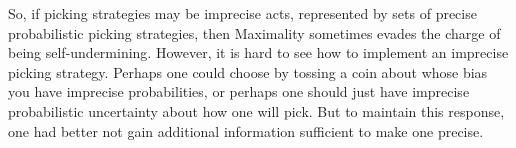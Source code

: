 \documentclass[a4paper]{article}
\newcommand\N{\mathbf{N}}
\renewcommand\P{\mathbb{P}} %
\newcommand\PowN{\mathbb{N}} %
\newcommand\Uset{\mathbb{U}} %
\newcommand\Exp{\mathsf{Exp}}
\newcommand\EU{\mathrm{EU}}
\newcommand\EAd{\mathrm{EAd}}
\newcommand\U{\mathfrak{U}} %
\newcommand\Maximality{\mathrm{Max}}
\newcommand{\IB}{\mathbb{B}}
\newcommand{\IP}{\P}
\renewcommand{\color}[1]{}
\newcommand\SetDelimiter[1][]{
	\nonscript\,#1\vert \allowbreak \nonscript\,\mathopen{}}
\providecommand\given{\SetDelimiter}
\renewcommand{\geq}{\geqslant}
\newenvironment{CCM rewritten}
{\begingroup\color{blue}} %
{\endgroup}              %
\begin{document}
	
%	
{\color{violet}
	So, if picking strategies may be imprecise acts, represented by sets of precise probabilistic picking strategies, then Maximality sometimes evades the charge of being self-undermining. However, it is hard to see how to implement an imprecise picking strategy. Perhaps one could choose by tossing a coin about whose bias you have imprecise probabilities, or perhaps one should just have imprecise probabilistic uncertainty about how one will pick. But to maintain this response, one had better not gain additional information sufficient to make one precise. 
	}
	
\end{document}
